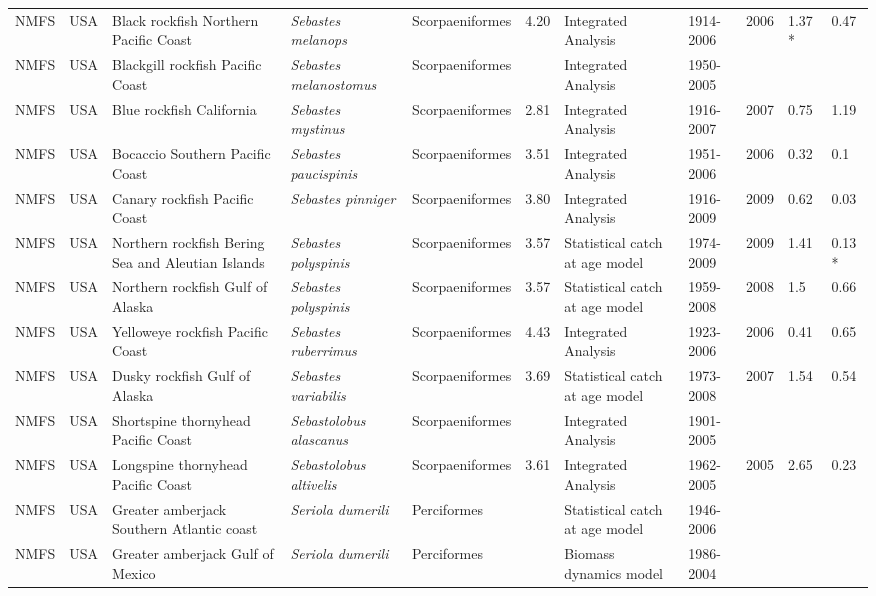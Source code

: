 \begin{longtable}{p{1.5cm}p{1.5cm}p{3cm}p{3cm}p{2.5cm}p{0.9cm}p{1.4cm}p{0.9cm}p{0.9cm}p{0.9cm}p{1cm}}
  NMFS & USA & Black rockfish Northern Pacific Coast & \textit{Sebastes melanops} & Scorpaeniformes & 4.20 & Integrated Analysis & 1914-2006 & 2006 & 1.37 * & 0.47 \\ 
  NMFS & USA & Blackgill rockfish  Pacific Coast & \textit{Sebastes melanostomus} & Scorpaeniformes &  & Integrated Analysis & 1950-2005 &  &  &  \\ 
  NMFS & USA & Blue rockfish California & \textit{Sebastes mystinus} & Scorpaeniformes & 2.81 & Integrated Analysis & 1916-2007 & 2007 & 0.75 & 1.19 \\ 
  NMFS & USA & Bocaccio Southern Pacific Coast & \textit{Sebastes paucispinis} & Scorpaeniformes & 3.51 & Integrated Analysis & 1951-2006 & 2006 & 0.32 & 0.1 \\ 
  NMFS & USA & Canary rockfish Pacific Coast & \textit{Sebastes pinniger} & Scorpaeniformes & 3.80 & Integrated Analysis & 1916-2009 & 2009 & 0.62 & 0.03 \\ 
  NMFS & USA & Northern rockfish Bering Sea and Aleutian Islands & \textit{Sebastes polyspinis} & Scorpaeniformes & 3.57 & Statistical catch at age model & 1974-2009 & 2009 & 1.41 & 0.13 * \\ 
  NMFS & USA & Northern rockfish Gulf of Alaska & \textit{Sebastes polyspinis} & Scorpaeniformes & 3.57 & Statistical catch at age model & 1959-2008 & 2008 & 1.5 & 0.66 \\ 
  NMFS & USA & Yelloweye rockfish Pacific Coast & \textit{Sebastes ruberrimus} & Scorpaeniformes & 4.43 & Integrated Analysis & 1923-2006 & 2006 & 0.41 & 0.65 \\ 
  NMFS & USA & Dusky rockfish Gulf of Alaska & \textit{Sebastes variabilis} & Scorpaeniformes & 3.69 & Statistical catch at age model & 1973-2008 & 2007 & 1.54 & 0.54 \\ 
  NMFS & USA & Shortspine thornyhead Pacific Coast & \textit{Sebastolobus alascanus} & Scorpaeniformes &  & Integrated Analysis & 1901-2005 &  &  &  \\ 
  NMFS & USA & Longspine thornyhead Pacific Coast & \textit{Sebastolobus altivelis} & Scorpaeniformes & 3.61 & Integrated Analysis & 1962-2005 & 2005 & 2.65 & 0.23 \\ 
  NMFS & USA & Greater amberjack Southern Atlantic coast & \textit{Seriola dumerili} & Perciformes &  & Statistical catch at age model & 1946-2006 &  &  &  \\ 
  NMFS & USA & Greater amberjack Gulf of Mexico & \textit{Seriola dumerili} & Perciformes &  & Biomass dynamics model & 1986-2004 &  &  &  \\ 

\end{longtable}
